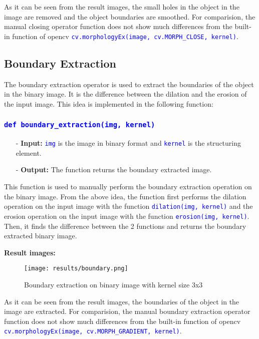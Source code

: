 \documentclass{report}
\begin{document}
As it can be seen from the result images, the small holes in the object in the image are removed and the object boundaries are smoothed. For comparision, the manual closing operator function does not show much differences from the built-in function of opencv \textcolor{blue}{\lstinline|cv.morphologyEx(image, cv.MORPH_CLOSE, kernel)|}.

\pagebreak
\subsection{Boundary Extraction}
The boundary extraction operator is used to extract the boundaries of the object in the binary image. It is the difference between the dilation and the erosion of the input image. This idea is implemented in the following function:

\subsubsection*{\textcolor{blue}{\lstinline|def boundary_extraction(img, kernel)|}}

\begin{itemize}
  \item[-] \textbf{Input:} \textcolor{blue}{\lstinline|img|} is the image in binary format and \textcolor{blue}{\lstinline|kernel|} is the structuring element.
  \item[-] \textbf{Output:} The function returns the boundary extracted image.
\end{itemize}

This function is used to manually perform the boundary extraction operation on the binary image. From the above idea, the function first performs the dilation operation on the input image with the function \textcolor{blue}{\lstinline|dilation(img, kernel)|} and the erosion operation on the input image with the function \textcolor{blue}{\lstinline|erosion(img, kernel)|}. Then, it finds the difference between the 2 functions and returns the boundary extracted binary image.

\textbf{Result images:}
\begin{figure}[H]
    \centering
    \texttt{[image: results/boundary.png]}
    \caption{Boundary extraction on binary image with kernel size 3x3}
\end{figure}

As it can be seen from the result images, the boundaries of the object in the image are extracted. For comparision, the manual boundary extraction operator function does not show much differences from the built-in function of opencv \textcolor{blue}{\lstinline|cv.morphologyEx(image, cv.MORPH_GRADIENT, kernel)|}.
\end{document}
